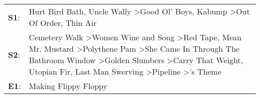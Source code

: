 \begin{supertabular}{p{0.03\textwidth}p{0.92\textwidth}}
 \textbf{S1}:  &                                                                                                                                                                                                                                                                                                                                                                                  Hurt Bird Bath\textsuperscript{}, \enspace Uncle Wally\textsuperscript{} \textgreater \enspace Good Ol' Boys\textsuperscript{}, \enspace Kabump\textsuperscript{} \textgreater \enspace Out Of Order\textsuperscript{}, \enspace Thin Air\textsuperscript{}  \enspace  \\
 \textbf{S2}:  &  Cemetery Walk\textsuperscript{} \textgreater \enspace Women Wine and Song\textsuperscript{} \textgreater \enspace Red Tape\textsuperscript{}, \enspace Mean Mr. Mustard\textsuperscript{} \textgreater \enspace Polythene Pam\textsuperscript{} \textgreater \enspace She Came In Through The Bathroom Window\textsuperscript{} \textgreater \enspace Golden Slumbers\textsuperscript{} \textgreater \enspace Carry That Weight\textsuperscript{}, \enspace Utopian Fir\textsuperscript{}, \enspace Last Man Swerving\textsuperscript{} \textgreater \enspace Pipeline\textsuperscript{} \textgreater {}'s Theme\textsuperscript{}  \enspace  \\
 \textbf{E1}:  &                                                                                                                                                                                                                                                                                                                                                                                                                                                                                                                                                                                                       Making Flippy Floppy\textsuperscript{}  \enspace  \\
\end{supertabular}
